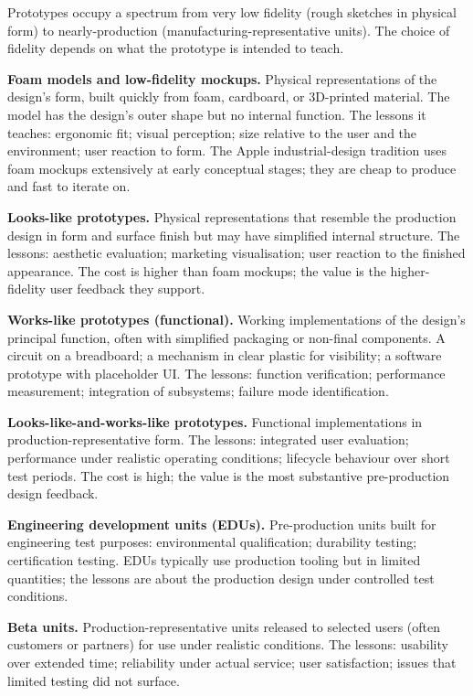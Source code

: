 Prototypes occupy a spectrum from very low fidelity (rough sketches in physical form) to nearly-production (manufacturing-representative units). The choice of fidelity depends on what the prototype is intended to teach.

\textbf{Foam models and low-fidelity mockups.} Physical representations of the design's form, built quickly from foam, cardboard, or 3D-printed material. The model has the design's outer shape but no internal function. The lessons it teaches: ergonomic fit; visual perception; size relative to the user and the environment; user reaction to form. The Apple industrial-design tradition uses foam mockups extensively at early conceptual stages; they are cheap to produce and fast to iterate on.

\textbf{Looks-like prototypes.} Physical representations that resemble the production design in form and surface finish but may have simplified internal structure. The lessons: aesthetic evaluation; marketing visualisation; user reaction to the finished appearance. The cost is higher than foam mockups; the value is the higher-fidelity user feedback they support.

\textbf{Works-like prototypes (functional).} Working implementations of the design's principal function, often with simplified packaging or non-final components. A circuit on a breadboard; a mechanism in clear plastic for visibility; a software prototype with placeholder UI. The lessons: function verification; performance measurement; integration of subsystems; failure mode identification.

\textbf{Looks-like-and-works-like prototypes.} Functional implementations in production-representative form. The lessons: integrated user evaluation; performance under realistic operating conditions; lifecycle behaviour over short test periods. The cost is high; the value is the most substantive pre-production design feedback.

\textbf{Engineering development units (EDUs).} Pre-production units built for engineering test purposes: environmental qualification; durability testing; certification testing. EDUs typically use production tooling but in limited quantities; the lessons are about the production design under controlled test conditions.

\textbf{Beta units.} Production-representative units released to selected users (often customers or partners) for use under realistic conditions. The lessons: usability over extended time; reliability under actual service; user satisfaction; issues that limited testing did not surface.

